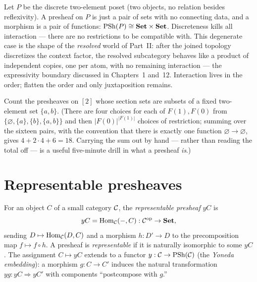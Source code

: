 \begin{example}\label{ch02:ex:psh-discrete}
Let $P$ be the discrete two-element poset (two objects, no relation
besides reflexivity). A presheaf on $P$ is just a pair of sets with
no connecting data, and a morphism is a pair of functions:
$\mathrm{PSh}(P) \cong \mathbf{Set} \times \mathbf{Set}$. Discreteness kills all interaction
--- there are no restrictions to be compatible with. This degenerate
case is the shape of the
\emph{resolved} world of Part~II: after the joined topology
discretizes the context factor, the resolved subcategory behaves like
a product of independent copies, one per atom, with no remaining
interaction --- the expressivity boundary discussed in Chapters~1
and~12. Interaction lives in the order; flatten the order and only
juxtaposition remains.
\end{example}

\begin{exercise}\label{ch02:exr:count-presheaves}
Count the presheaves on $[2]$ whose section sets are subsets of a fixed
two-element set $\{a, b\}$. (There are four choices for each of
$F(1), F(0)$ from $\{\varnothing, \{a\}, \{b\}, \{a,b\}\}$ and then
$|F(0)|^{|F(1)|}$ choices of restriction; summing over the sixteen
pairs, with the convention that there is exactly one function
$\varnothing \to \varnothing$, gives $4 + 2 \cdot 4 + 6 = 18$.
Carrying the sum out by hand --- rather than reading the total off
--- is a useful five-minute drill in what a presheaf \emph{is}.)
\end{exercise}

\section{Representable presheaves}\label{ch02:sec:representables}

\begin{definition}\label{ch02:def:representable}
For an object $C$ of a small category $\mathcal{C}$, the \emph{representable
presheaf} $yC$ is
\[
yC = \mathrm{Hom}_{\mathcal{C}}(-, C) : \mathcal{C}^{\mathrm{op}} \to \mathbf{Set},
\]
sending $D \mapsto \mathrm{Hom}_{\mathcal{C}}(D, C)$ and a morphism $h : D' \to D$ to
the precomposition map $f \mapsto f \circ h$. A presheaf is
\emph{representable} if it is naturally isomorphic to some $yC$. The
assignment $C \mapsto yC$ extends to a functor
$y : \mathcal{C} \to \mathrm{PSh}(\mathcal{C})$ (the \emph{Yoneda embedding}): a morphism
$g : C \to C'$ induces the natural transformation
$yg : yC \Rightarrow yC'$ with components ``postcompose with $g$.''
\end{definition}

